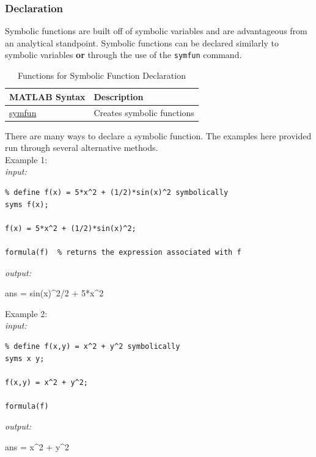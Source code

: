\documentclass[../MATLAB_Primer.tex]{subfiles}
\begin{document}
\subsubsection{Declaration}
Symbolic functions are built off of symbolic variables and are advantageous from an analytical standpoint. Symbolic functions can be declared similarly to symbolic variables \textbf{or} through the use of the \texttt{symfun} command. 

\begin{table}[H]
\caption{Functions for Symbolic Function Declaration}
    \begin{center}
        \begin{tabular}{| C{3cm} | m{12cm}|}
            \hline
            \textbf{MATLAB Syntax} & \textbf{Description}\\
            
            \hline
            \href{https://www.mathworks.com/help/symbolic/symfun.html}{\color{blue}symfun} & Creates symbolic functions\\
            \hline
        \end{tabular}
        \label{tab:symbolic_functions}
    \end{center}
\end{table}

There are many ways to declare a symbolic function.  The examples here provided run through several alternative methods.\\

Example 1:\\

\textit{input:}
\begin{lstlisting}
% define f(x) = 5*x^2 + (1/2)*sin(x)^2 symbolically 
syms f(x);

f(x) = 5*x^2 + (1/2)*sin(x)^2; 

formula(f)  % returns the expression associated with f
\end{lstlisting}
\textit{output:}
\begin{center}
    ans = sin(x)\^{}2/2 + 5*x\^{}2 
\end{center}

Example 2:\\

\textit{input:}
\begin{lstlisting}
% define f(x,y) = x^2 + y^2 symbolically 
syms x y;

f(x,y) = x^2 + y^2; 

formula(f)
\end{lstlisting}
\textit{output:}
\begin{center}
    ans = x\^{}2 + y\^{}2 
\end{center}
\end{document}
